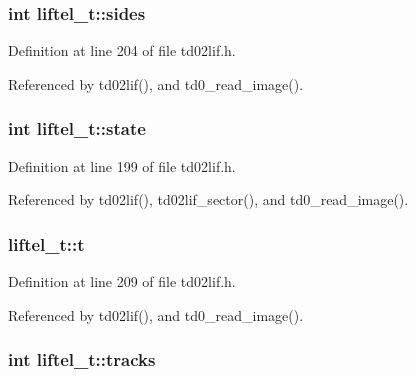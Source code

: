 \subsubsection[{\texorpdfstring{sides}{sides}}]{\setlength{\rightskip}{0pt plus 5cm}int liftel\+\_\+t\+::sides}\hypertarget{structliftel__t_aabd804e27f6ab37de1ef9b890a0f1088}{}\label{structliftel__t_aabd804e27f6ab37de1ef9b890a0f1088}


Definition at line 204 of file td02lif.\+h.



Referenced by td02lif(), and td0\+\_\+read\+\_\+image().

\subsubsection[{\texorpdfstring{state}{state}}]{\setlength{\rightskip}{0pt plus 5cm}int liftel\+\_\+t\+::state}\hypertarget{structliftel__t_a579b9a2411fc6cf4bcdd4cac15d48e49}{}\label{structliftel__t_a579b9a2411fc6cf4bcdd4cac15d48e49}


Definition at line 199 of file td02lif.\+h.



Referenced by td02lif(), td02lif\+\_\+sector(), and td0\+\_\+read\+\_\+image().

\subsubsection[{\texorpdfstring{t}{t}}]{ liftel\+\_\+t\+::t}\hypertarget{structliftel__t_a19ad0aafb060bc0262c7946220f0c407}{}\label{structliftel__t_a19ad0aafb060bc0262c7946220f0c407}


Definition at line 209 of file td02lif.\+h.



Referenced by td02lif(), and td0\+\_\+read\+\_\+image().

\subsubsection[{\texorpdfstring{tracks}{tracks}}]{\setlength{\rightskip}{0pt plus 5cm}int liftel\+\_\+t\+::tracks}\hypertarget{structliftel__t_a24244c0ee111d3f46eedd7578eb1acf7}{}\label{structliftel__t_a24244c0ee111d3f46eedd7578eb1acf7}


